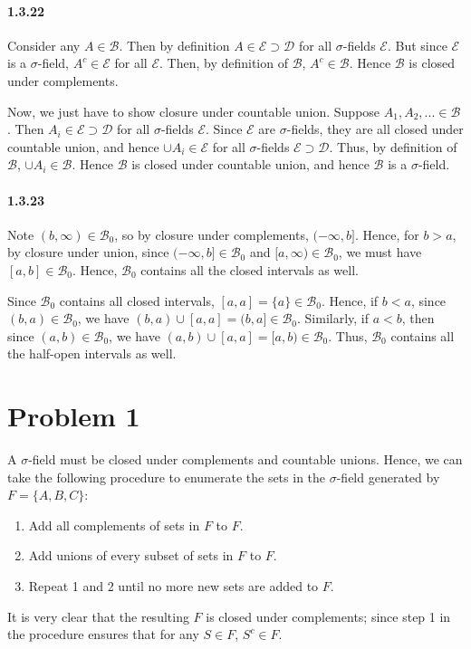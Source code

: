 \documentclass[10pt,letter]{article}
\begin{document}
\paragraph{1.3.22}
Consider any $A \in \mathcal{B}$. Then by definition $A \in \mathcal{E} \supset \mathcal{D}$ for all $\sigma$-fields $\mathcal{E}$. But since $\mathcal{E}$ is a $\sigma$-field, $A^c \in \mathcal{E}$ for all $\mathcal{E}$. Then, by definition of $\mathcal{B}$, $A^c \in \mathcal{B}$. Hence $\mathcal{B}$ is closed under complements.

Now, we just have to show closure under countable union. Suppose $A_1, A_2, ... \in \mathcal{B}$. Then $A_i \in \mathcal{E} \supset \mathcal{D}$ for all $\sigma$-fields $\mathcal{E}$. Since $\mathcal{E}$ are $\sigma$-fields, they are all closed under countable union, and hence $\cup A_i \in \mathcal{E}$ for all $\sigma$-fields $\mathcal{E} \supset \mathcal{D}$. Thus, by definition of $\mathcal{B}$, $\cup A_i \in \mathcal{B}$. Hence $\mathcal{B}$ is closed under countable union, and hence $\mathcal{B}$ is a $\sigma$-field.
\paragraph{1.3.23}
Note $(b, \infty) \in \mathcal{B}_0$, so by closure under complements, $(-\infty, b]$. Hence, for $b > a$, by closure under union, since $(-\infty, b] \in \mathcal{B}_0$ and $[a, \infty) \in \mathcal{B}_0$, we must have $[a, b] \in \mathcal{B}_0$. Hence, $\mathcal{B}_0$ contains all the closed intervals as well.

Since $\mathcal{B}_0$ contains all closed intervals, $[a,a] = \{ a\} \in \mathcal{B}_0$. Hence, if $b < a$, since $(b, a) \in \mathcal{B}_0$, we have $(b,a) \cup [a,a] = (b, a] \in \mathcal{B}_0$. Similarly, if $a < b$, then since  $(a, b) \in \mathcal{B}_0$, we have $(a, b) \cup [a,a] = [a, b) \in \mathcal{B}_0$. Thus, $\mathcal{B}_0$ contains all the half-open intervals as well.

\section*{Problem 1}
A $\sigma$-field must be closed under complements and countable unions. Hence, we can take the following procedure to enumerate the sets in the $\sigma$-field generated by $F = \{ A, B, C \}$:
\begin{enumerate}
\item Add all complements of sets in $F$ to $F$.
\item Add unions of every subset of sets in $F$ to $F$.
\item Repeat 1 and 2 until no more new sets are added to $F$.
\end{enumerate}
It is very clear that the resulting $F$ is closed under complements; since step 1 in the procedure ensures that for any $S \in F$, $S^c \in F$.
\end{document}
